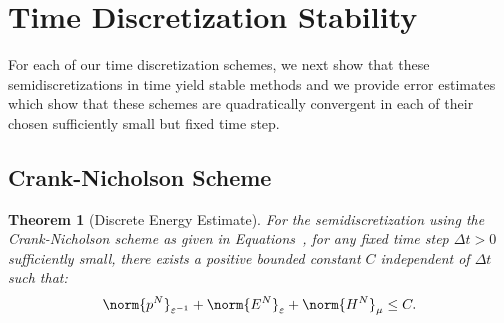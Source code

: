 \documentclass{amsart}
\theoremstyle{thmstyleone}%
\newtheorem{theorem}{Theorem}%
\theoremstyle{thmstyletwo}%
\theoremstyle{thmstylethree}%
\begin{document}
\section{Time Discretization Stability} \label{sec:time_disc_stab}

For each of our time discretization schemes, we next show that these semidiscretizations in time yield stable methods and we provide error estimates which show that these schemes are quadratically convergent in each of their chosen sufficiently small but fixed time step.

\subsection{Crank-Nicholson Scheme}

\begin{theorem}[Discrete Energy Estimate] \label{thm:dscrt_enrgy_estmt_cn}
For the semidiscretization using the Crank-Nicholson scheme as given in Equations~, for any fixed time step $\Delta t > 0$ sufficiently small, there exists a positive bounded constant $C$ independent of $\Delta t$ such that:
\[
  \norm{p^N}_{\varepsilon^{-1}} + \norm{E^N}_{\varepsilon} + \norm{H^N}_{\mu} \le C.
\]
\end{theorem}
\end{document}
